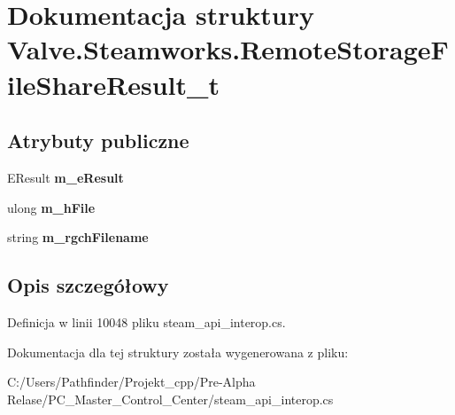 \hypertarget{struct_valve_1_1_steamworks_1_1_remote_storage_file_share_result__t}{}\section{Dokumentacja struktury Valve.\+Steamworks.\+Remote\+Storage\+File\+Share\+Result\+\_\+t}
\label{struct_valve_1_1_steamworks_1_1_remote_storage_file_share_result__t}
\subsection*{Atrybuty publiczne}
\begin{DoxyCompactItemize}
\item 
\mbox{\label{struct_valve_1_1_steamworks_1_1_remote_storage_file_share_result__t_a9164c136f626671a9725c2df95616c37}} 
E\+Result {\bfseries m\+\_\+e\+Result}
\item 
\mbox{\label{struct_valve_1_1_steamworks_1_1_remote_storage_file_share_result__t_afe8bde5721e16ba2b95162e74b371c83}} 
ulong {\bfseries m\+\_\+h\+File}
\item 
\mbox{\label{struct_valve_1_1_steamworks_1_1_remote_storage_file_share_result__t_a2b43c467070be1b214c13abe6e20facd}} 
string {\bfseries m\+\_\+rgch\+Filename}
\end{DoxyCompactItemize}


\subsection{Opis szczegółowy}


Definicja w linii 10048 pliku steam\+\_\+api\+\_\+interop.\+cs.



Dokumentacja dla tej struktury została wygenerowana z pliku\+:\begin{DoxyCompactItemize}
\item 
C\+:/\+Users/\+Pathfinder/\+Projekt\+\_\+cpp/\+Pre-\/\+Alpha Relase/\+P\+C\+\_\+\+Master\+\_\+\+Control\+\_\+\+Center/steam\+\_\+api\+\_\+interop.\+cs\end{DoxyCompactItemize}
